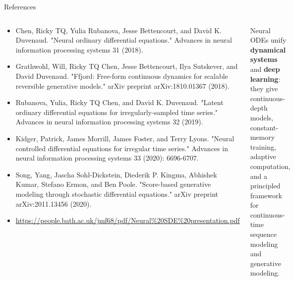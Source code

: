 \documentclass[aspectratio=169,xcolor=dvipsnames,svgnames,x11names,fleqn]{beamer}
\begin{document}
\begin{frame}{References}
\scriptsize

\begin{columns}
\begin{block}{}
\begin{itemize}
  \item Chen, Ricky TQ, Yulia Rubanova, Jesse Bettencourt, and David K. Duvenaud. "Neural ordinary differential equations." Advances in neural information processing systems 31 (2018).
  \item Grathwohl, Will, Ricky TQ Chen, Jesse Bettencourt, Ilya Sutskever, and David Duvenaud. "Ffjord: Free-form continuous dynamics for scalable reversible generative models." arXiv preprint arXiv:1810.01367 (2018).
  \item Rubanova, Yulia, Ricky TQ Chen, and David K. Duvenaud. "Latent ordinary differential equations for irregularly-sampled time series." Advances in neural information processing systems 32 (2019).
  \item Kidger, Patrick, James Morrill, James Foster, and Terry Lyons. "Neural controlled differential equations for irregular time series." Advances in neural information processing systems 33 (2020): 6696-6707.
  \item Song, Yang, Jascha Sohl-Dickstein, Diederik P. Kingma, Abhishek Kumar, Stefano Ermon, and Ben Poole. "Score-based generative modeling through stochastic differential equations." arXiv preprint arXiv:2011.13456 (2020).
  \item \url{https://people.bath.ac.uk/jmf68/pdf/Neural\%20SDE\%20presentation.pdf}
\end{itemize}
\end{block}
\begin{tblockFrost}{}
Neural ODEs unify \textbf{dynamical systems} and \textbf{deep learning}: they give continuous-depth models, constant-memory training, adaptive computation, and a principled framework for continuous-time sequence modeling and generative modeling.
\end{tblockFrost}
\end{columns}
\end{frame}
 

 
\end{document}
